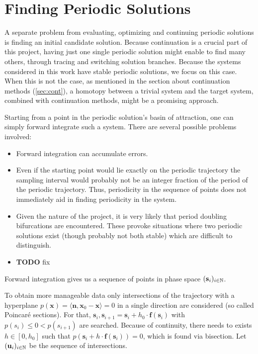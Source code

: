 \section{Finding Periodic Solutions}
\label{sec:initial}

A separate problem from evaluating, optimizing and continuing periodic solutions is finding an initial candidate solution.
Because continuation is a crucial part of this project, having just one single periodic solution might enable to find many others, through tracing and switching solution branches.
Because the systems considered in this work have stable periodic solutions, we focus on this case.
When this is not the case, as mentioned in the section about continuation methods (\autoref{sec:cont}), a homotopy between a trivial system and the target system, combined with continuation methods, might be a promising approach.

Starting from a point in the periodic solution's basin of attraction, one can simply forward integrate such a system.
There are several possible problems involved:
\begin{itemize}
	\item Forward integration can accumulate errors.
	\item Even if the starting point would lie exactly on the periodic trajectory the sampling interval would probably not be an integer fraction of the period of the periodic trajectory.
		Thus, periodicity in the sequence of points does not immediately aid in finding periodicity in the system.
	\item Given the nature of the project, it is very likely that period doubling bifurcations are encountered.
		These provoke situations where two periodic solutions exist (though probably not both stable) which are difficult to distinguish.
	\item \textbf{TODO} fix %
\end{itemize}
Forward integration gives us a sequence of points in phase space $(\textbf{s}_i)_{i \in \mathbb{N}}$.

To obtain more manageable data only intersections of the trajectory with a hyperplane $p(\textbf{x}) = \langle \textbf{n}, \textbf{x}_0 - \textbf{x} \rangle = 0$ in a single direction are considered (so called Poincaré sections).
For that, $\textbf{s}_i, \textbf{s}_{i+1} = \textbf{s}_i + h_0 \cdot \textbf{f}(\textbf{s}_i)$ with $p(s_i) \le 0 < p(s_{i+1})$ are searched.
Because of continuity, there needs to exists $h \in [0,h_0]$ such that $p(\textbf{s}_i + h \cdot \textbf{f}(\textbf{s}_i)) = 0$, which is found via bisection.
Let $(\textbf{u}_i)_{i \in \mathbb{N}}$ be the sequence of intersections.

